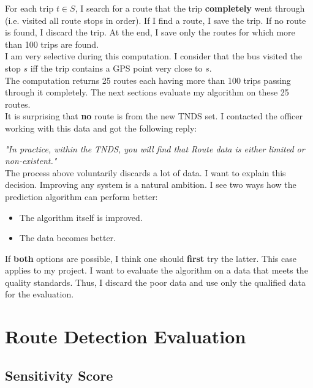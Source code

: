 \documentclass[12pt,a4paper,oneside,openright]{report}
\begin{document}
For each trip $t \in S$, I search for a route that the trip \textbf{completely}
went through (i.e. visited all route stops in order). If I find a route, I save the trip. If no route is found, I discard the
trip. At the end, I save only the routes for which more than 100 trips 
are found. \\

I am very selective during this computation. I consider that the bus visited
the stop $s$ iff the trip contains a GPS point very close to $s$. \\



The computation returns 25 routes each having more than 100 trips passing through it completely. The next
sections evaluate my algorithm on these 25 routes. \\

It is surprising that \textbf{no} route is from the new TNDS set. I contacted the officer
working with this data and got the following reply:

\textit{"In practice, within the TNDS, you will find that Route data is either limited or
non-existent."} \\

The process above voluntarily discards a lot of data. I want to explain this decision.
Improving any system is a natural ambition. I see two ways how the prediction algorithm can
perform better:

\begin{itemize} 
\item The algorithm itself is improved.
\item The data becomes better.
\end{itemize}

If \textbf{both} options are possible, I think one should \textbf{first} try the latter.
This case applies to my project. I want to evaluate the algorithm on a data that meets
the quality standards. Thus, I discard the poor data and use only the qualified data for the
evaluation. \\


\section{Route Detection Evaluation}

\subsection{Sensitivity Score}
\end{document}
